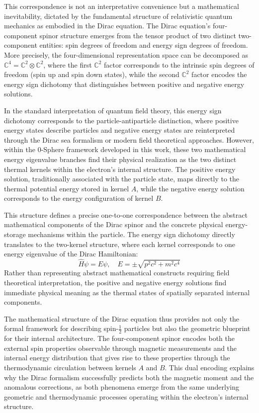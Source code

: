 \documentclass[%
 reprint,
 amsmath,amssymb,
 aps,
]{revtex4-1}
\numberwithin{equation}{section}%
\begin{document}
This correspondence is not an interpretative convenience but a mathematical inevitability, dictated by the fundamental structure of relativistic quantum mechanics as embodied in the Dirac equation. The Dirac equation's four-component spinor structure emerges from the tensor product of two distinct two-component entities: spin degrees of freedom and energy sign degrees of freedom. More precisely, the four-dimensional representation space can be decomposed as $\mathbb{C}^4 = \mathbb{C}^2 \otimes \mathbb{C}^2$, where the first $\mathbb{C}^2$ factor corresponds to the intrinsic spin degrees of freedom (spin up and spin down states), while the second $\mathbb{C}^2$ factor encodes the energy sign dichotomy that distinguishes between positive and negative energy solutions.

In the standard interpretation of quantum field theory, this energy sign dichotomy corresponds to the particle-antiparticle distinction, where positive energy states describe particles and negative energy states are reinterpreted through the Dirac sea formalism or modern field theoretical approaches. However, within the 0-Sphere framework developed in this work, these two mathematical energy eigenvalue branches find their physical realization as the two distinct thermal kernels within the electron's internal structure. The positive energy solution, traditionally associated with the particle state, maps directly to the thermal potential energy stored in kernel $A$, while the negative energy solution corresponds to the energy configuration of kernel $B$.

This structure defines a precise one-to-one correspondence between the abstract mathematical components of the Dirac spinor and the concrete physical energy-storage mechanisms within the particle. The energy sign dichotomy directly translates to the two-kernel structure, where each kernel corresponds to one energy eigenvalue of the Dirac Hamiltonian:
\begin{equation}
\hat{H}\psi = E\psi, \quad E = \pm\sqrt{p^2c^2 + m^2c^4} \label{eq:dirac_eigenvalue}
\end{equation}
Rather than representing abstract mathematical constructs requiring field theoretical interpretation, the positive and negative energy solutions find immediate physical meaning as the thermal states of spatially separated internal components.

The mathematical structure of the Dirac equation thus provides not only the formal framework for describing spin-$\frac{1}{2}$ particles but also the geometric blueprint for their internal architecture. The four-component spinor encodes both the external spin properties observable through magnetic measurements and the internal energy distribution that gives rise to these properties through the thermodynamic circulation between kernels $A$ and $B$. This dual encoding explains why the Dirac formalism successfully predicts both the magnetic moment and the anomalous corrections, as both phenomena emerge from the same underlying geometric and thermodynamic processes operating within the electron's internal structure.
\end{document}
